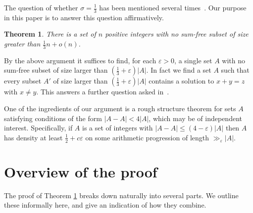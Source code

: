 \documentclass[10pt,reqno]{amsart}
\newtheorem{theorem}{Theorem}[section]
\theoremstyle{definition}
\theoremstyle{remark}
\renewcommand{\leq}{\leqslant}
\def\eps{\varepsilon}
\numberwithin{equation}{section}
\begin{document}
The question of whether $\sigma=\tfrac{1}{3}$ has been mentioned several times~\cite{alonspencer,crootlev,erdos1,erdos2,guy,kolountzakis}. Our purpose in this paper is to answer this question affirmatively.

\begin{theorem}\label{mainthm}
There is a set of $n$ positive integers with no sum-free subset of size greater than $\frac{1}{3}n + o(n)$.
\end{theorem}


By the above argument it suffices to find, for each $\eps>0$, a single set $A$ with no sum-free subset of size larger than $\left(\tfrac{1}{3}+\eps\right)|A|$. In fact we find a set $A$ such that every subset $A'$ of size larger than $\left(\tfrac{1}{3}+\eps\right)|A|$ contains a solution to $x+y=z$ with $x\neq y$. This answers a further question asked in~\cite{erdos1}.

One of the ingredients of our argument is a rough structure theorem for sets $A$ satisfying conditions of the form $|A-A|<4|A|$, which may be of independent interest. Specifically, if $A$ is a set of integers with $|A-A|\leq(4-\eps)|A|$ then $A$ has density at least $\frac{1}{2} + c\eps$ on some arithmetic progression of length $\gg_{\eps} |A|$. 

\section{Overview of the proof}

\label{sec2}

The proof of Theorem \ref{mainthm} breaks down naturally into several parts.  We outline these informally here, and give an indication of how they combine.
\end{document}
